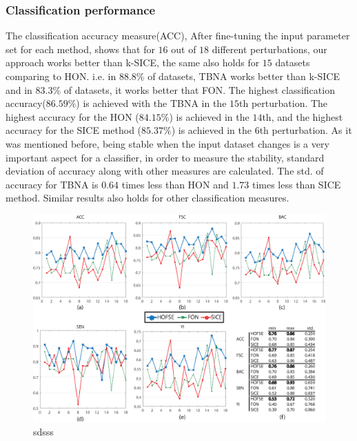 \documentclass[journal]{IEEEtran}
\begin{document}
	\subsubsection{Classification performance}
	The classification accuracy measure(ACC), After fine-tuning the input parameter set for each method, shows that for $16$ out of $18$ different perturbations, our approach works better than k-SICE, the same also holds for $15$ datasets comparing to HON. i.e. in $88.8 \%$ of datasets, TBNA works better than k-SICE and in $83.3 \%$ of datasets, it works better that FON.  
	The highest classification accuracy($86.59\%$) is achieved with the TBNA in the $15$th perturbation. The highest accuracy for the HON ($84.15\%$) is achieved in the $14$th, and the highest accuracy for the SICE method ($85.37\%$) is achieved in the $6$th perturbation. As it was mentioned before, being stable when the input dataset changes is a very important aspect for a classifier, in order to measure the stability, standard deviation of accuracy along with other measures are
	calculated. The std. of accuracy for TBNA is $0.64$ times less than HON and $1.73$ times less than SICE method. Similar results also holds for other classification measures.
	\begin{figure}
		\centering
		\includegraphics[width=7in]{Final}
		\caption{
			sdsss 
		}
		\label{g3.2}
	\end{figure}
	
\end{document}

